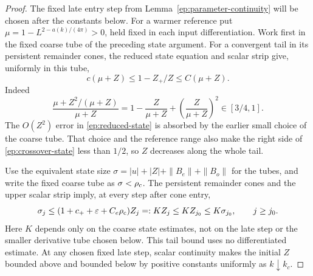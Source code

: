 \begin{proof}
The fixed late entry step from Lemma~\ref{ep:parameter-continuity}
will be chosen after the constants below.  For a warmer reference
put $\mu=1-L^{2-a(k)/(4\pi)}>0$, held fixed in each
input differentiation.  Work first in the fixed coarse tube of the
preceding state argument.  For a convergent tail in its persistent
remainder cones, the reduced state equation and scalar strip give,
uniformly in this tube,
\begin{equation}\label{ep:crossover-state}
 c(\mu+Z)\le1-Z_+/Z\le C(\mu+Z).
\end{equation}
Indeed
\[
 \frac{\mu+Z^2/(\mu+Z)}{\mu+Z}
 =1-\frac{Z}{\mu+Z}+\left(\frac{Z}{\mu+Z}\right)^2
 \in[3/4,1].
\]
The $O(Z^2)$ error in
\eqref{ep:reduced-state} is absorbed by the earlier small choice of
the coarse tube.  That choice and the reference range also make the
right side of \eqref{ep:crossover-state} less than $1/2$, so $Z$
decreases along the whole tail.

Use the equivalent state size
$\sigma=|u|+|Z|+\|B_e\|+\|B_o\|$ for the tubes, and write the fixed
coarse tube as $\sigma<\rho_{\rm c}$.  The persistent remainder cones
and the upper scalar strip imply, at every step after cone entry,
\[
 \sigma_j\le
 (1+c_++\varepsilon+C_e\rho_{\rm c})Z_j
 =:KZ_j\le KZ_{j_0}\le K\sigma_{j_0},\qquad j\ge j_0 .
\]
Here $K$ depends only on the coarse state estimates, not on the late
step or the smaller derivative tube chosen below.  This tail bound
uses no differentiated estimate.
At any chosen fixed late step, scalar continuity makes the initial
$Z$ bounded above and bounded below by positive constants uniformly
as $k\downarrow k_c$.


\end{proof}
